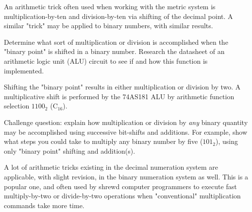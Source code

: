 

An arithmetic trick often used when working with the metric system is multiplication-by-ten and division-by-ten via shifting of the decimal point.  A similar "trick" may be applied to binary numbers, with similar results.

Determine what sort of multiplication or division is accomplished when the "binary point" is shifted in a binary number.  Research the datasheet of an arithmetic logic unit (ALU) circuit to see if and how this function is implemented.







Shifting the "binary point" results in either multiplication or division by two.  A multiplicative shift is performed by the 74AS181 ALU by arithmetic function selection $1100_2$ (C$_{16}$).

\vskip 10pt

Challenge question: explain how multiplication or division by {\it any} binary quantity may be accomplished using successive bit-shifts and additions.  For example, show what steps you could take to multiply any binary number by five ($101_2$), using only "binary point" shifting and addition(s).







A lot of arithmetic tricks existing in the decimal numeration system are applicable, with slight revision, in the binary numeration system as well.  This is a popular one, and often used by shrewd computer programmers to execute fast multiply-by-two or divide-by-two operations when "conventional" multiplication commands take more time.




